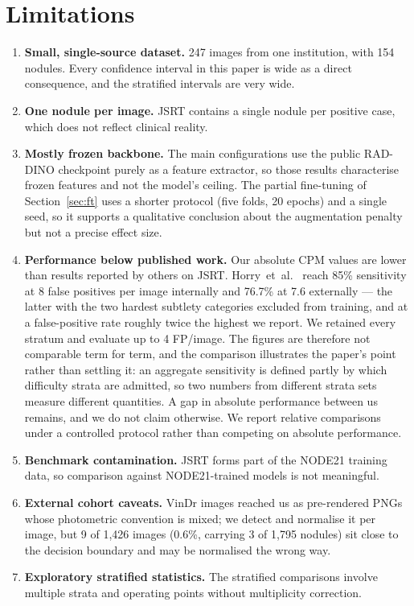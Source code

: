 \documentclass[11pt,a4paper]{article}
\begin{document}
\section{Limitations}

\begin{enumerate}
  \item \textbf{Small, single-source dataset.} 247 images from one institution,
        with 154 nodules. Every confidence interval in this paper is wide as a
        direct consequence, and the stratified intervals are very wide.
  \item \textbf{One nodule per image.} JSRT contains a single nodule per
        positive case, which does not reflect clinical reality.
  \item \textbf{Mostly frozen backbone.} The main configurations use the public
        RAD-DINO checkpoint purely as a feature extractor, so those results characterise frozen
        features and not the model's ceiling. The partial fine-tuning of
        Section~\ref{sec:ft} uses a shorter protocol (five folds, 20 epochs) and
        a single seed, so it supports a qualitative conclusion about the
        augmentation penalty but not a precise effect size.
  \item \textbf{Performance below published work.} Our absolute CPM values are
        lower than results reported by others on JSRT.
        Horry~et~al.~\cite{horry2023fullres} reach 85\% sensitivity at 8 false
        positives per image internally and 76.7\% at 7.6 externally --- the
        latter with the two hardest subtlety categories excluded from training,
        and at a false-positive rate roughly twice the highest we report. We
        retained every stratum and evaluate up to 4 FP/image. The figures are
        therefore not comparable term for term, and the comparison illustrates
        the paper's point rather than settling it: an aggregate sensitivity is
        defined partly by which difficulty strata are admitted, so two numbers
        from different strata sets measure different quantities. A gap in
        absolute performance between us remains, and we do not claim otherwise.
        We report
        relative comparisons under a controlled protocol rather than competing
        on absolute performance.
  \item \textbf{Benchmark contamination.} JSRT forms part of the NODE21
        training data, so comparison against NODE21-trained models is not
        meaningful.
  \item \textbf{External cohort caveats.} VinDr images reached us as
        pre-rendered PNGs whose photometric convention is mixed; we detect and
        normalise it per image, but 9 of 1{,}426 images (0.6\%, carrying 3 of
        1{,}795 nodules) sit close to the decision boundary and may be
        normalised the wrong way.
  \item \textbf{Exploratory stratified statistics.} The stratified comparisons
        involve multiple strata and operating points without multiplicity
        correction.
\end{enumerate}
\end{document}
